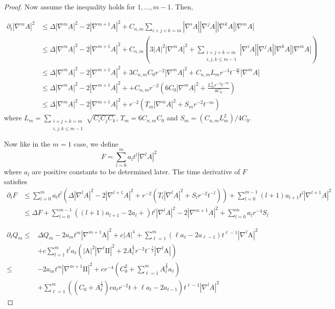 \begin{proof}
    Now assume the inequality holds for $ 1, \dots,m-1 $. Then, 
  
      \begin{align*}
        \partial_{t}|\nabla^{m} A|^{2} &\le \Delta |\nabla^{m}A|^{2}- 2|\nabla^{m+1}A|^{2} + C_{n,m} \sum_{i+j+k= m}^{} |\nabla^{i}A||\nabla^{j}A||\nabla^{k}A||\nabla^{m}A|  \\
        & \le \Delta |\nabla^{m}A|^{2}- 2|\nabla^{m+1}A|^{2} + C_{n,m}\left( 3|A|^{2}|\nabla^{m}A|^{2} + \sum_{\substack{i+j+k=m\\i,j,k \le m-1}}^{}|\nabla^{i}A||\nabla^{j}A| |\nabla^{k}A||\nabla^{m} A|  \right) \\
        & \le \Delta|\nabla^{m}A|^{2}- 2|\nabla^{m+1}A|^{2}+ 3C_{n,m}C_{0}r^{-2}|\nabla^{m}A|^{2} + C_{n,m}L_{m}r^{-3}t^{-\frac{m}{2}}|\nabla^{m}A| \\
        & \le \Delta|\nabla^{m}A|^{2}- 2|\nabla^{m+1}A|^{2} + + C_{n,m}r^{-2}\left(6C_{0}|\nabla^{m}A|^{2} + \frac{L_{m}^{2}r^{-2}t^{-m}}{4C_{0}}  \right) \\
        & \le \Delta|\nabla^{m}A|^{2}- 2|\nabla^{m+1}A|^{2} + r^{-2}(T_{m}|\nabla^{m}A|^{2}+ S_{m}r^{-2}t^{-m})
    \end{align*}
    where $ L_{m} = \sum_{\substack{i+j+k=m\\i,j,k \le m-1}}\sqrt{C_{i}C_{j}C_{k}}  $, $ T_{m} = 6C_{n,m}C_{0} $ and $ S_{m} = (C_{n,m}L_{m}^{2}) / 4C_{0} $.

    Now like in the $ m=1 $ case, we define 
    \[ F = \sum_{l=0}^{m}a_{l}t^{l}|\nabla^{l} A|^{2} \]
    where $ a_{l} $ are positive constants to be determined later. The time derivative of $ F $ satisfies \begin{align*}
        \partial_{t}F & \le \sum_{l=0}^{m}a_{l}t^{l}\left(\Delta|\nabla^{l}A|^{2}- 2|\nabla^{l+1}A|^{2} + r^{-2}(T_{l}|\nabla^{l}A|^{2}+ S_{l}r^{-2}t^{-l}) \right) + \sum_{l=0}^{m-1}(l+1)a_{l+1}t^{l}|\nabla^{l+1}A|^{2} \\
        & \le \Delta F + \sum_{l=0}^{m-1}((l+1)a_{l+1}-2a_{l}+)t^{l}|\nabla^{l}A|^{2} -2|\nabla^{m+1}A|^{2} + \sum_{l=0}^{m}a_{l}r^{-4}S_{l} 
    \end{align*}

\begin{align*}
\partial_t Q_m \leq & \Delta Q_{m} -2 a_m t^m\left|\nabla^{m+1} \mathrm{A}\right|^2+c|A|^4 +\sum_{\ell=1}^m\left(\ell a_{\ell}-2 a_{\ell-1}\right) t^{\ell-1}\left|\nabla^{\ell} \mathrm{A}\right|^2 \\
& + c \sum_{l=1}^m t^{l} a_{\ell}\left(|\mathrm{A}|^2\left|\nabla^{\ell} \mathrm{II}\right|^2+2 A_{\ell}^{\frac{1}{2}} r^{-3} t^{-\frac{l}{2}}\left|\nabla^{l} \mathrm{A}\right|\right) \\
\leq & -2 a_m t^m\left|\nabla^{m+1} \mathrm{II}\right|^2+c r^{-4}\left(C_0^2+\sum_{\ell=1}^m A_{\ell}^{\frac{2}{3}} a_{\ell}\right) \\
& +\sum_{\ell=1}^m\left(\left(C_0+A_{\ell}^{\frac{1}{3}}\right) c a_{\ell} r^{-2} t+\ell a_{l}-2 a_{l-1}\right) t^{\ell-1}\left|\nabla^{l} A\right|^2
\end{align*}


\end{proof}
